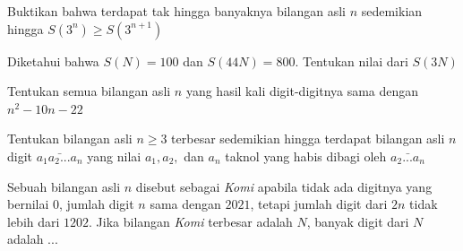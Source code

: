 \documentclass[11pt]{scrartcl}
\begin{document}
    \begin{problem}[Rusia MO 1997]
    Buktikan bahwa terdapat tak hingga banyaknya bilangan asli $n$ sedemikian hingga $S(3^n) \geq S(3^{n + 1})$
    \end{problem}
    
    \begin{problem}[Rusia MO 1999]
    Diketahui bahwa $S(N) = 100$ dan $S(44N) = 800$. Tentukan nilai dari $S(3N)$
    \end{problem}
    
    \begin{problem}[IMO 1968]
    Tentukan semua bilangan asli $n$ yang hasil kali digit-digitnya sama dengan $n^2 - 10n - 22$
    \end{problem}
    
    \begin{problem}
    Tentukan bilangan asli $n \geq 3$ terbesar sedemikian hingga terdapat bilangan asli $n$ digit $\bar{a_1a_2...a_n}$ yang nilai $a_1, a_2,$ dan $a_n$ taknol yang habis dibagi oleh $\bar{a_2...a_n}$
    \end{problem}

    \begin{problem}
        Sebuah bilangan asli $n$ disebut sebagai \textit{Komi} apabila tidak ada digitnya yang bernilai $0$, jumlah digit $n$ sama dengan $2021$, tetapi jumlah digit dari $2n$ tidak lebih dari $1202$. Jika bilangan \textit{Komi} terbesar adalah $N$, banyak digit dari $N$ adalah ...
    \end{problem}
    
\end{document}
